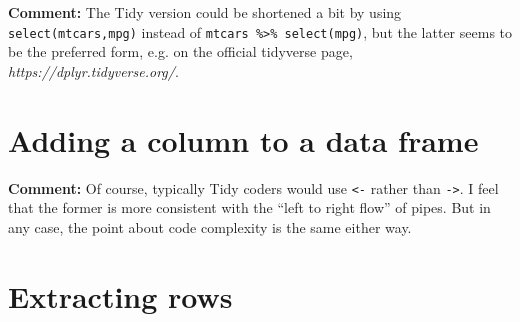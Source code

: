 \documentclass[11pt]{article}
\begin{document}
\textbf{Comment:}  The Tidy version could be shortened a bit by using
\lstinline{select(mtcars,mpg)} instead of 
\lstinline{mtcars %>% select(mpg)}, 
but the latter seems to be the preferred form,
e.g. on the official tidyverse page, \textit{https://dplyr.tidyverse.org/}.  

\section*{Adding a column to a data frame}

\begin{parcolumns}[rulebetween=true]{2}


\hspace{0.1in}


\end{parcolumns}

\bigskip

\textbf{Comment:}
Of course, typically Tidy coders would use \lstinline{<-}
rather than \lstinline{->}.  I feel that the former is more
consistent with the ``left to right flow'' of pipes.  But in any case,
the point about code complexity is the same either way.

\section*{Extracting rows}
\end{document}
